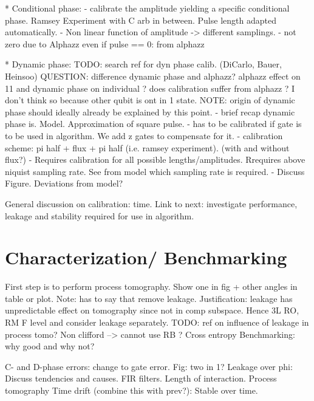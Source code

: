 * Conditional phase:
- calibrate the amplitude yielding a specific conditional phase. Ramsey Experiment with C arb in between. Pulse length adapted automatically.  
- Non linear function of amplitude -> different samplings.
- not zero due to Alphazz even if pulse == 0: from alphazz
 
* Dynamic phase:
TODO: search ref for dyn phase calib.  (DiCarlo, Bauer, Heinsoo)
QUESTION: difference dynamic phase and alphazz? alphazz effect on 11 and dynamic phase on individual ? does calibration suffer from alphazz ? I don't think so because other qubit is ont in 1 state.
NOTE: origin of dynamic phase should ideally already be explained by this point.
- brief recap dynamic phase is. Model. Approximation of square pulse.
- has to be calibrated if gate is to be used in algorithm. We add z gates to compensate for it. 
- calibration scheme: pi half + flux + pi half (i.e. ramsey experiment). (with and without flux?)
- Requires calibration for all possible lengths/amplitudes. Rrequires above niquist sampling rate.
See from model which sampling rate is required.
- Discuss Figure. Deviations from model? 

General discussion on calibration: time.
Link to next: investigate performance, leakage and stability required for use in algorithm.
\section{Characterization/ Benchmarking}
First step is to perform process tomography. Show one in fig + other angles in table or plot. 
Note: has to say that remove leakage. Justification: leakage has unpredictable effect on tomography since not in comp subspace. 
Hence 3L RO, RM F level and consider leakage separately. TODO: ref on influence of leakage in process tomo?
Non clifford --> cannot use RB ? 
Cross entropy Benchmarking: why good and why not?

 C- and D-phase errors: change to gate error. Fig: two in 1?
 Leakage over phi: Discuss tendencies and causes. FIR filters. Length of interaction.
 Process tomography
Time drift (combine this with prev?): Stable over time.